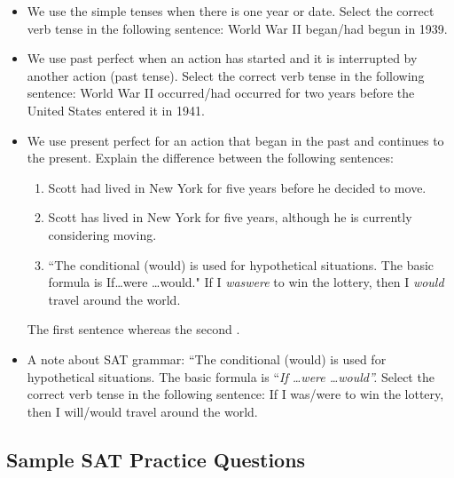 \begin{itemize}
\item{We use the simple tenses when there is one year or date. Select the correct verb tense in the following sentence: World War II
began/had begun in 1939.}
\item{We use past perfect when an action has started and it is interrupted by another action (past
tense). Select the correct verb tense in the following sentence: World War II occurred/had occurred for two years before the United
States entered it in 1941.}
\item{We use present perfect for an action that began in the past and continues to the present.
Explain the difference between the following sentences:}

\begin{enumerate}
\item{Scott had lived in New York for five years before he decided to move.}
\item{Scott has lived in New York for five years, although he is currently considering moving.}
\item{``The conditional (would) is used for hypothetical situations. The basic formula is \/If\ldots were \ldots would." If I \textit{was\/were} to win the lottery, then I \textit{would} travel around the world.}

\end{enumerate}

The first sentence \hrulefill whereas the second \hrulefill.

\item A note about SAT grammar: ``The conditional (would) is used for hypothetical situations. The basic formula is ``\textit{If \ldots were \ldots would''.} Select the correct verb tense in the following sentence: If I was/were to win the lottery, then I will/would travel around the world.

\end{itemize}

\subsection{Sample SAT Practice Questions}

